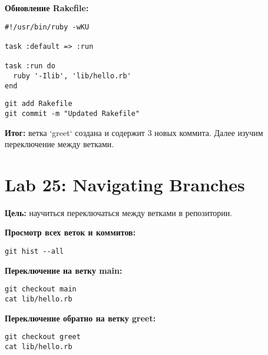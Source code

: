 \documentclass[a4paper,12pt]{report}
\begin{document}
\textbf{Обновление Rakefile:}
\begin{verbatim}
#!/usr/bin/ruby -wKU

task :default => :run

task :run do
  ruby '-Ilib', 'lib/hello.rb'
end
\end{verbatim}

\begin{verbatim}
git add Rakefile
git commit -m "Updated Rakefile"
\end{verbatim}


\textbf{Итог:} ветка `greet` создана и содержит 3 новых коммита. Далее изучим переключение между ветками.

\section{Lab 25: Navigating Branches}

\textbf{Цель:} научиться переключаться между ветками в репозитории.

\textbf{Просмотр всех веток и коммитов:}
\begin{verbatim}
git hist --all
\end{verbatim}


\textbf{Переключение на ветку main:}
\begin{verbatim}
git checkout main
cat lib/hello.rb
\end{verbatim}


\textbf{Переключение обратно на ветку greet:}
\begin{verbatim}
git checkout greet
cat lib/hello.rb
\end{verbatim}

\end{document}
